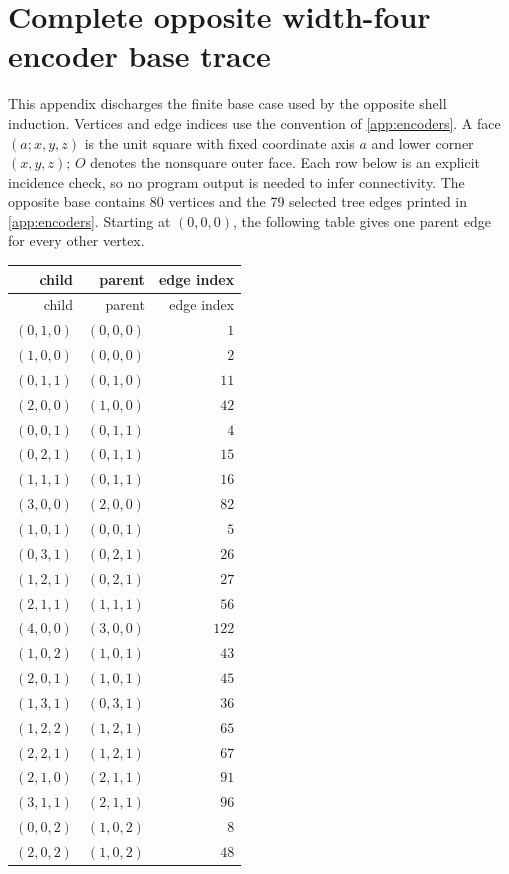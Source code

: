 \section{Complete opposite width-four encoder base trace}
\label{app:width4-opposite-trace}
This appendix discharges the finite base case used by the opposite shell induction.  Vertices and edge indices use the convention of \cref{app:encoders}.  A face $(a;x,y,z)$ is the unit square with fixed coordinate axis $a$ and lower corner $(x,y,z)$; $O$ denotes the nonsquare outer face.  Each row below is an explicit incidence check, so no program output is needed to infer connectivity.
The opposite base contains 80 vertices and the 79 selected tree edges printed in \cref{app:encoders}.  Starting at $(0,0,0)$, the following table gives one parent edge for every other vertex.
\begin{longtable}{@{}rrr@{}}
\toprule child & parent & edge index\\ \midrule
\endfirsthead \toprule child & parent & edge index\\ \midrule \endhead
$(0,1,0)$ & $(0,0,0)$ & $1$\\
$(1,0,0)$ & $(0,0,0)$ & $2$\\
$(0,1,1)$ & $(0,1,0)$ & $11$\\
$(2,0,0)$ & $(1,0,0)$ & $42$\\
$(0,0,1)$ & $(0,1,1)$ & $4$\\
$(0,2,1)$ & $(0,1,1)$ & $15$\\
$(1,1,1)$ & $(0,1,1)$ & $16$\\
$(3,0,0)$ & $(2,0,0)$ & $82$\\
$(1,0,1)$ & $(0,0,1)$ & $5$\\
$(0,3,1)$ & $(0,2,1)$ & $26$\\
$(1,2,1)$ & $(0,2,1)$ & $27$\\
$(2,1,1)$ & $(1,1,1)$ & $56$\\
$(4,0,0)$ & $(3,0,0)$ & $122$\\
$(1,0,2)$ & $(1,0,1)$ & $43$\\
$(2,0,1)$ & $(1,0,1)$ & $45$\\
$(1,3,1)$ & $(0,3,1)$ & $36$\\
$(1,2,2)$ & $(1,2,1)$ & $65$\\
$(2,2,1)$ & $(1,2,1)$ & $67$\\
$(2,1,0)$ & $(2,1,1)$ & $91$\\
$(3,1,1)$ & $(2,1,1)$ & $96$\\
$(0,0,2)$ & $(1,0,2)$ & $8$\\
$(2,0,2)$ & $(1,0,2)$ & $48$\\

\end{longtable}
